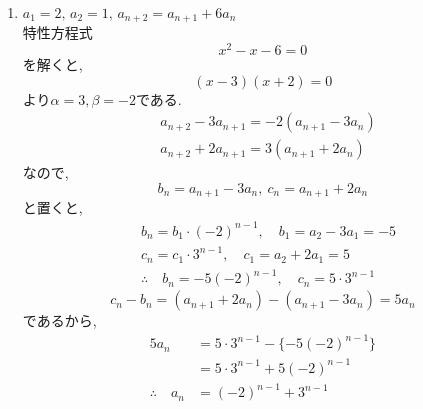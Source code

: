 \begin{enumerate}[label=(\arabic*),parsep=3pt,format=\bookitemlink{example-three-term-1}{solution}{problem}]
\[            \]
            したがって
            \[
              a_{n+1}-2a_n=2^n
            \]
            である.両辺を$2^{n+1}$で割ると,
            \[
              \frac{a_{n+1}}{2^{n+1}}-\frac{a_n}{2^n}=\frac12
            \]
            ここで
            \[
              c_n=\dfrac{a_n}{2^n}
            \]
            と置くと,
            \begin{align*}
              &c_{n+1}=c_n+\frac12,\quad c_1=\frac{a_1}{2}=\frac12\\
              &\therefore \quad c_n=\frac12+(n-1)\cdot\frac12=\frac n2\\
              &\therefore \quad a_n=2^n\cdot c_n=n\cdot2^{n-1}
            \end{align*}
      \item $\displaystyle a_1=2,\,a_2=1,\, a_{n+2}=a_{n+1}+6a_n$\\
            特性方程式
            \[
              x^2-x-6=0
            \]
            を解くと,
            \[
              (x-3)(x+2)=0
            \]
            より$\alpha=3,\beta=-2$である.
            \begin{align*}
              &a_{n+2}-3a_{n+1}=-2(a_{n+1}-3a_n)\\
              &a_{n+2}+2a_{n+1}=3(a_{n+1}+2a_n)
            \end{align*}
            なので,
            \[
              b_n=a_{n+1}-3a_n,\ c_n=a_{n+1}+2a_n
            \]
            と置くと,
            \begin{align*}
              &b_n=b_1\cdot(-2)^{n-1},\quad b_1=a_2-3a_1=-5\\
              &c_n=c_1\cdot3^{n-1},\quad c_1=a_2+2a_1=5\\
              &\therefore \quad b_n=-5(-2)^{n-1},\quad c_n=5\cdot3^{n-1}
            \end{align*}
            \[
              c_n-b_n=(a_{n+1}+2a_n)-(a_{n+1}-3a_n)=5a_n
            \]
            であるから,
            \begin{align*}
              5a_n&=5\cdot3^{n-1}-\{-5(-2)^{n-1}\}\\
              &=5\cdot3^{n-1}+5(-2)^{n-1}\\
              \therefore\quad a_n&=(-2)^{n-1}+3^{n-1}
            \end{align*}
    \end{enumerate}


